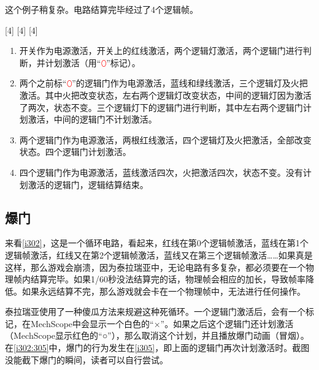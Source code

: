 \begin{example}{}{}

  \begin{center}
  \end{center}

  这个例子稍复杂。电路结算完毕经过了4个逻辑帧。

  \begin{center}
    [4]%
    [4]%
    [4]%
  \end{center}

  \begin{enumerate}
    \item 开关作为电源激活，开关上的红线激活，两个逻辑灯激活，两个逻辑门进行判断，并计划激活（用“\textcolor{red}{⬯}”标记）。
    \item 两个之前标“\textcolor{red}{⬯}”的逻辑门作为电源激活，蓝线和绿线激活，三个逻辑灯及火把激活。其中火把改变状态，左右两个逻辑灯改变状态，中间的逻辑灯因为激活了两次，状态不变。三个逻辑灯下的逻辑门进行判断，其中左右两个逻辑门计划激活，中间的逻辑门不计划激活。
    \item 两个逻辑门作为电源激活，两根红线激活，四个逻辑灯及火把激活，全部改变状态。四个逻辑门计划激活。
    \item 四个逻辑门作为电源激活，蓝线激活四次，火把激活四次，状态不变。没有计划激活的逻辑门，逻辑结算结束。
  \end{enumerate}

\end{example}

\subsection{爆门}

来看\autoref{i302}，这是一个循环电路，看起来，红线在第0个逻辑帧激活，蓝线在第1个逻辑帧激活，红线又在第2个逻辑帧激活，蓝线又在第三个逻辑帧激活……如果真是这样，那么游戏会崩溃，因为泰拉瑞亚中，无论电路有多复杂，都必须要在一个物理帧内结算完毕。如果1/60秒没法结算完的话，物理帧会相应的加长，导致帧率降低。如果永远结算不完，那么游戏就会卡在一个物理帧中，无法进行任何操作。

泰拉瑞亚使用了一种傻瓜方法来规避这种死循环。一个逻辑门激活后，会有一个标记，在MechScope中会显示一个白色的“×”。如果之后这个逻辑门还计划激活（MechScope显示红色的“○”），那么取消这个计划，并且播放爆门动画（冒烟）。在\autoref{i302:305}中，爆门的行为发生在\autoref{i305}，即上面的逻辑门再次计划激活时。截图没能截下爆门的瞬间，读者可以自行尝试。

